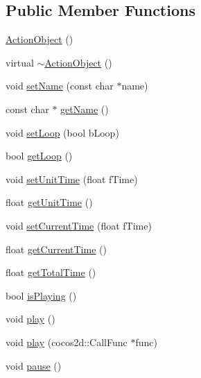 \subsection*{Public Member Functions}
\begin{DoxyCompactItemize}
\item 
\hyperlink{classcocostudio_1_1ActionObject_a8078d816f95fa33f277ac43f730ff9b0}{Action\+Object} ()
\item 
virtual \hyperlink{classcocostudio_1_1ActionObject_a63b4d046cddfefcfe5cbaef99af0b9ff}{$\sim$\+Action\+Object} ()
\item 
void \hyperlink{classcocostudio_1_1ActionObject_a49c04b9506ebdc6dbb96d01d461140f5}{set\+Name} (const char $\ast$name)
\item 
const char $\ast$ \hyperlink{classcocostudio_1_1ActionObject_a7f0034620aec8f124b81e33c0e6610be}{get\+Name} ()
\item 
void \hyperlink{classcocostudio_1_1ActionObject_a188046afbabf20869af3aaef2762e4e2}{set\+Loop} (bool b\+Loop)
\item 
bool \hyperlink{classcocostudio_1_1ActionObject_a47928c29236770a5df9dcc9a2405a032}{get\+Loop} ()
\item 
void \hyperlink{classcocostudio_1_1ActionObject_acc4551d83f908653f207de243da3dde3}{set\+Unit\+Time} (float f\+Time)
\item 
float \hyperlink{classcocostudio_1_1ActionObject_a4cf75b80f67a1a170616b39d352f989e}{get\+Unit\+Time} ()
\item 
void \hyperlink{classcocostudio_1_1ActionObject_a031f6e35417d37f74d303c816284c11f}{set\+Current\+Time} (float f\+Time)
\item 
float \hyperlink{classcocostudio_1_1ActionObject_a3937f4c1b4897d30662266535c1264a0}{get\+Current\+Time} ()
\item 
float \hyperlink{classcocostudio_1_1ActionObject_a8df3a8c5f7bc60f29e783f44830fab67}{get\+Total\+Time} ()
\item 
bool \hyperlink{classcocostudio_1_1ActionObject_ab3a5940502a32dbd778990dc1a47389a}{is\+Playing} ()
\item 
void \hyperlink{classcocostudio_1_1ActionObject_afc5c69af1ec901b81461beb4f0c094cc}{play} ()
\item 
void \hyperlink{classcocostudio_1_1ActionObject_a2be572de273340713eb91f0393a336ed}{play} (cocos2d\+::\+Call\+Func $\ast$func)
\item 
void \hyperlink{classcocostudio_1_1ActionObject_a96d9dcb811d26e9c3ca729f9ec51f18a}{pause} ()
\item 

\end{DoxyCompactItemize}
